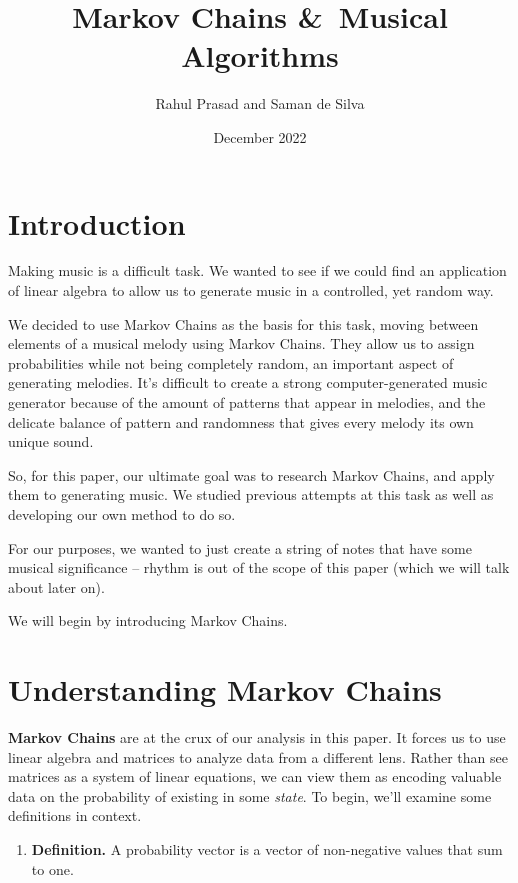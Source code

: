 \documentclass{article}
\title{Markov Chains \&\ Musical Algorithms}
\author{Rahul Prasad and Saman de Silva}
\date{December 2022}
\begin{document}
\maketitle

\section{Introduction}

Making music is a difficult task. We wanted to see if we could find an application of linear algebra to allow us to generate music in a controlled, yet random way. 

We decided to use Markov Chains as the basis for this task, moving between elements of a musical melody using Markov Chains. They allow us to assign probabilities while not being completely random, an important aspect of generating melodies. It's difficult to create a strong computer-generated music generator because of the amount of patterns that appear in melodies, and the delicate balance of pattern and randomness that gives every melody its own unique sound.

So, for this paper, our ultimate goal was to research Markov Chains, and apply them to generating music. We studied previous attempts at this task as well as developing our own method to do so. 

For our purposes, we wanted to just create a string of notes that have some musical significance -- rhythm is out of the scope of this paper (which we will talk about later on).

We will begin by introducing Markov Chains.

\section{Understanding Markov Chains}

\textbf{Markov Chains} are at the crux of our analysis in this paper. It forces us to use linear algebra and matrices to analyze data from a different lens. Rather than see matrices as a system of linear equations, we can view them as encoding valuable data on the probability of existing in some \textit{state}. To begin, we'll examine some definitions in context.

\setlength{\parskip}{10pt}

\begin{enumerate}[label=]
    \item \textbf{Definition.} A probability vector is a vector of non-negative values that sum to one. 
\end{enumerate}
\end{document}
